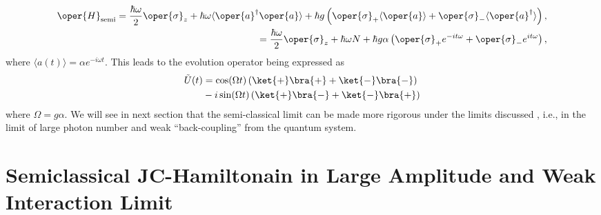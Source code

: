 \begin{equation}
    \label{eq:chap5_JCM_Hamiltonian_semi}
    \begin{aligned}
        \oper{H}_{\text{semi}} = \frac{\hbar\omega}{2} \oper{\sigma}_z + \hbar \omega \langle \oper{a}^\dagger \oper{a} \rangle
    + \hbar g \left( \oper{\sigma}_+ \langle \oper{a} \rangle + \oper{\sigma}_- \langle \oper{a}^\dagger \rangle \right),\\
    = \frac{\hbar\omega}{2} \oper{\sigma}_z + \hbar \omega N 
    + \hbar g \alpha\left( \oper{\sigma}_+ e^{-it\omega} + \oper{\sigma}_- e^{it\omega} \right),
    \end{aligned}
\end{equation}
where \(\langle a(t) \rangle = \alpha e^{-i\omega t}\). This leads to the evolution operator being expressed as
\begin{align}
        \tilde{U}(t) &= 
                \cos(\Omega t) \left(\ket{+}\bra{+} + 
                \ket{-}\bra{-} \right)  \nonumber\\
                &- i \sin(\Omega t)
                 \left( \ket{+}\bra{-}
                +\ket{-}\bra{+}\right)
\end{align}
where \(\Omega = {g\alpha}\). We will see in next section that the semi-classical limit can be made more rigorous
under the limits discussed , i.e., in the limit of 
large photon number and weak ``back-coupling'' from the quantum system.

\section{Semiclassical JC-Hamiltonain  in Large Amplitude and Weak Interaction Limit}

